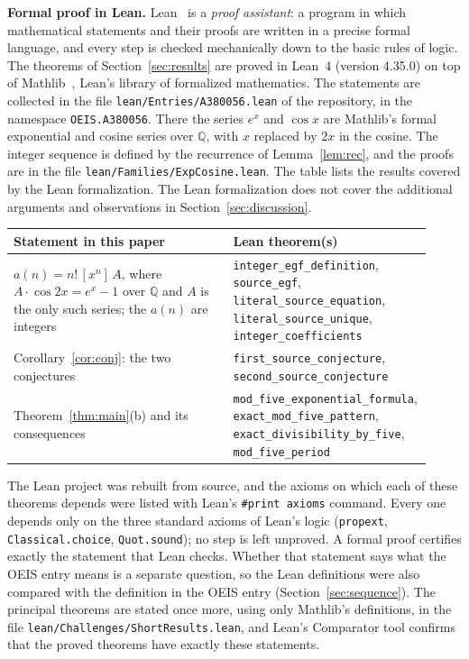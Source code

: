 \documentclass[11pt,a4paper]{article}
\theoremstyle{definition}
\theoremstyle{remark}
\newcommand{\Q}{\mathbb{Q}}
\newcommand{\coeff}[2]{[x^{#1}]\,#2}
\newcommand{\para}[1]{\par\medskip\noindent\textbf{#1}\enspace}
\begin{document}
\para{Formal proof in Lean.}
Lean~\cite{lean} is a \emph{proof assistant}: a program in which mathematical statements and their proofs are written
in a precise formal language, and every step is checked mechanically down to the basic rules of logic. The theorems of Section~\ref{sec:results} are proved in Lean~4 (version 4.35.0) on top of
Mathlib~\cite{mathlib}, Lean's library of formalized mathematics. The statements are collected in the file \texttt{lean/Entries/A380056.lean} of the repository,
in the namespace \texttt{OEIS.A380056}. There the series $e^x$ and $\cos x$ are Mathlib's formal exponential and cosine series over $\Q$, with $x$ replaced by $2x$ in the cosine. The integer sequence is defined by the recurrence of Lemma~\ref{lem:rec}, and the proofs are in the file \texttt{lean/Families/ExpCosine.lean}.
The table lists the results covered by the Lean formalization. The Lean formalization does not cover the additional arguments and observations in Section~\ref{sec:discussion}.
\begin{center}\small\renewcommand{\arraystretch}{1.25}
\begin{tabular}{>{\raggedright\arraybackslash}p{0.52\linewidth}>{\raggedright\arraybackslash}p{0.4\linewidth}}
\toprule
Statement in this paper & Lean theorem(s)\\
\midrule
$a(n)=n!\,\coeff{n}{A}$, where $A\cdot\cos2x=e^x-1$ over $\Q$ and $A$ is the only such series; the $a(n)$ are integers & \texttt{integer\_\allowbreak{}egf\_\allowbreak{}definition}, \texttt{source\_\allowbreak{}egf}, \texttt{literal\_\allowbreak{}source\_\allowbreak{}equation}, \texttt{literal\_\allowbreak{}source\_\allowbreak{}unique}, \texttt{integer\_\allowbreak{}coefficients} \\
Corollary~\ref{cor:conj}: the two conjectures & \texttt{first\_\allowbreak{}source\_\allowbreak{}conjecture}, \texttt{second\_\allowbreak{}source\_\allowbreak{}conjecture} \\
Theorem~\ref{thm:main}(b) and its consequences & \texttt{mod\_\allowbreak{}five\_\allowbreak{}exponential\_\allowbreak{}formula}, \texttt{exact\_\allowbreak{}mod\_\allowbreak{}five\_\allowbreak{}pattern}, \texttt{exact\_\allowbreak{}divisibility\_\allowbreak{}by\_\allowbreak{}five}, \texttt{mod\_\allowbreak{}five\_\allowbreak{}period} \\
\bottomrule
\end{tabular}
\end{center}
The Lean project was rebuilt from source, and the axioms on which each of these theorems depends were listed with
Lean's \texttt{\#print axioms} command. Every one depends only on the three standard axioms of Lean's logic
(\texttt{propext}, \texttt{Classical.choice}, \texttt{Quot.sound}); no step is left unproved. A formal proof certifies
exactly the statement that Lean checks. Whether that statement says what the OEIS entry means is a separate question,
so the Lean definitions were also compared with the definition in the OEIS entry
(Section~\ref{sec:sequence}). The principal theorems are stated once more, using only Mathlib's definitions, in the
file \texttt{lean/Challenges/ShortResults.lean}, and Lean's Comparator tool confirms that the
proved theorems have exactly these statements.
\end{document}

